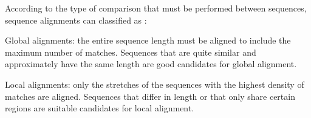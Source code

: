 \label{subsec:classes}
According to the type of comparison that must be performed between sequences, sequence alignments can 
classified as \citep{mount:2001a}:

\begin{mitemize}
\item
Global alignments: 
the entire sequence length must be aligned to include the maximum number of matches. 
Sequences that are quite similar and approximately have the same length are good candidates for global alignment.
\begin{center}
\end{center}

\item
Local alignments: 
only the stretches of the sequences with the highest density of matches are aligned.
Sequences that differ in length or that only share certain regions are suitable candidates
for local alignment.

\begin{center}
\end{center}
\end{mitemize}

